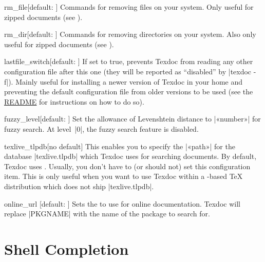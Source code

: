 \documentclass{texdoc-doc}
\begin{document}
\begin{confitem}{rm\_file}{}[default: ]
Commands for removing files on your system. Only useful for zipped documents
(see ).
\end{confitem}

\begin{confitem}{rm\_dir}{}[default: ]
Commands for removing directories on your system. Also only useful for zipped
documents (see ).
\end{confitem}

\begin{confitem}{lastfile\_switch}{}[default: ]
If set to true, prevents Texdoc from reading any other configuration file after
this one (they will be reported as ``disabled'' by |texdoc -f|). Mainly useful
for installing a newer version of Texdoc in your home and preventing the
default configuration file from older versions to be used (see the
\href{https://github.com/TeX-Live/texdoc}{README} for instructions on how to do
so).
\end{confitem}

\begin{confitem}{fuzzy\_level}{}[default: ]
Set the allowance of Levenshtein distance to |«number»| for fuzzy search. At
level~|0|, the fuzzy search feature is disabled.
\end{confitem}

\begin{confitem}{texlive\_tlpdb}{}[no default]
This enables you to specify the |«path»| for the database |texlive.tlpdb| which
Texdoc uses for searching documents. By default, Texdoc uses
. Usually, you don't have to (or should
not) set this configuration item. This is only useful when you want to use
Texdoc within a {\TL}-based {\TeX} distribution which does not ship
|texlive.tlpdb|.
\end{confitem}

\begin{confitem}{online\_url}{}
  [default: ]
Sets the  to use for online documentation. Texdoc will replace
|PKGNAME| with the name of the package to search for.
\end{confitem}

\section{Shell Completion}
\label{sec:completion}
\end{document}
